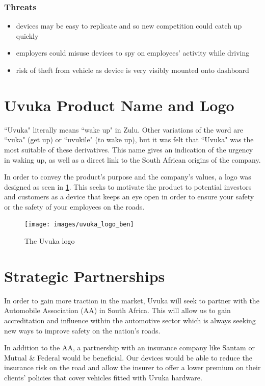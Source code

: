 \vskip15pt
\subsubsection{Threats}
\vskip8pt
\begin{itemize}
\item devices may be easy to replicate and so new competition could catch up quickly
\item employers could misuse devices to spy on employees' activity while driving
\item risk of theft from vehicle as device is very visibly mounted onto dashboard
\end{itemize}
\vskip15pt

\section{Uvuka Product Name and Logo}
``Uvuka" literally means ``wake up" in Zulu. Other variations of the word are ``vuka" (get up) or ``uvukile" (to wake up), but it was felt that ``Uvuka" was the most suitable of these derivatives. This name gives an indication of the urgency in waking up, as well as a direct link to the South African origins of the company.

In order to convey the product's purpose and the company's values, a logo was designed as seen in \cref{fig:uvuka_logo}. This seeks to motivate the product to potential investors and customers as a device that keeps an eye open in order to ensure your safety or the safety of your employees on the roads.

\begin{figure}[H]
\centering
\texttt{[image: images/uvuka\_logo\_ben]}
\vskip10pt
\caption[The Uvuka logo]{The Uvuka logo}
\label{fig:uvuka_logo}
\end{figure}

\section{Strategic Partnerships}
In order to gain more traction in the market, Uvuka will seek to partner with the Automobile Association (AA) in South Africa. This will allow us to gain accreditation and influence within the automotive sector which is always seeking new ways to improve safety on the nation's roads.

In addition to the AA, a partnership with an insurance company like Santam or Mutual \& Federal would be beneficial. Our devices would be able to reduce the insurance risk on the road and allow the insurer to offer a lower premium on their clients' policies that cover vehicles fitted with Uvuka hardware.

